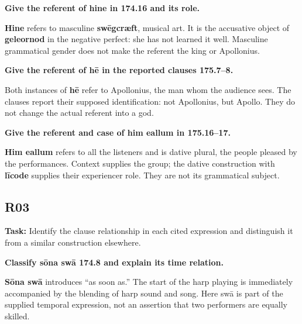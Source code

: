 \textbf{Give the referent of hine in 174.16 and its role.}

\textbf{Hine} refers to masculine \textbf{swēgcræft}, musical art. It is the accusative object of \textbf{geleornod} in the negative perfect: she has not learned it well. Masculine grammatical gender does not make the referent the king or Apollonius.

\textbf{Give the referent of hē in the reported clauses 175.7–8.}

Both instances of \textbf{hē} refer to Apollonius, the man whom the audience sees. The clauses report their supposed identification: not Apollonius, but Apollo. They do not change the actual referent into a god.

\textbf{Give the referent and case of him eallum in 175.16–17.}

\textbf{Him eallum} refers to all the listeners and is dative plural, the people pleased by the performances. Context supplies the group; the dative construction with \textbf{līcode} supplies their experiencer role. They are not its grammatical subject.

\subsection*{R03}

\textbf{Task:} Identify the clause relationship in each cited expression and distinguish it from a similar construction elsewhere.

\textbf{Classify sōna swā 174.8 and explain its time relation.}

\textbf{Sōna swā} introduces “as soon as.” The start of the harp playing is immediately accompanied by the blending of harp sound and song. Here swā is part of the supplied temporal expression, not an assertion that two performers are equally skilled.

